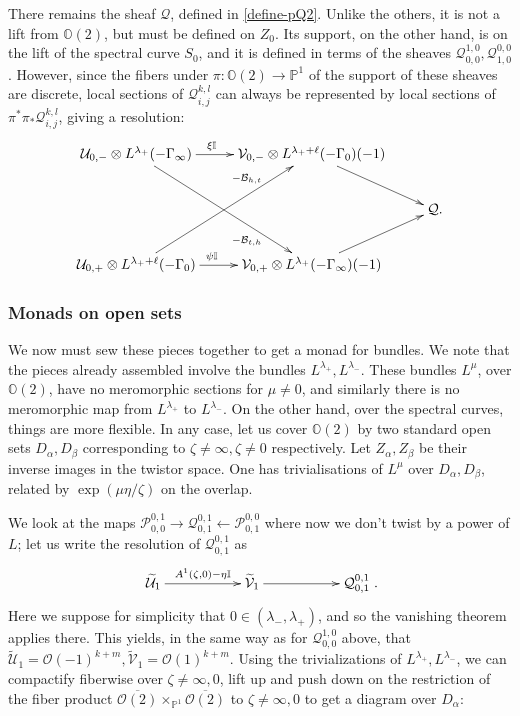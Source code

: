 \documentclass[12pt]{article}
\theoremstyle{definition}
\theoremstyle{remark}
\numberwithin{theorem}{section}
\def\bP{{\mathbb {P}}}
\def\bO{{\mathbb {O}}}
\def\bI{{\mathbb {I}}}
\def\pB{{\mathcal B}}
\def\pO{{\mathcal O}}
\def\pP{{\mathcal P}}
\def\pQ{{\mathcal Q}}
\def\pU{{\mathcal U}}
\def\pV{{\mathcal V}}
\begin{document}
There remains the sheaf $\pQ$, defined in \eqref{define-pQ2}. Unlike the others, it is not a lift from $\bO(2)$, but must be defined on $Z_0.$  Its support, on the other hand, is on the lift of the spectral curve $S_0$, and it is defined in terms of the sheaves $\pQ_{0 ,0}^{ 1,0}, \pQ^{0 ,0}_{ 1,0}$. However, since the fibers under  $\pi: \bO(2)\rightarrow \bP^1$ of the  support of these sheaves are discrete, local sections of  $\pQ_{i,j}^{ k,l}$ can always be represented by local sections of $\pi^*\pi_*\pQ_{i,j}^{ k,l}$, giving a resolution:
 \begin{equation} \label{define-pQ2-twistor}\xymatrix{  
\pU_{0,-}\otimes L^{\lambda_+ }(-\Gamma_\infty)   \ar[ddr]_(0.7){- \pB_{t,h}}\ar[r]^(0.43){\xi\bI} &  \pV_{0,-}\otimes L^{\lambda_++\ell} (-\Gamma_0 ) (-1)   \ar[dr] \\ 
 &&\pQ. \\
 \pU_{0,+}\otimes L^{\lambda_+ +\ell}( -\Gamma_0)  \ar[uur]^(0.7){ -  \pB_{h,t}}\ar[r]^(0.43){\psi\bI} &  \pV_{0,+}\otimes L^{\lambda_+ }(-\Gamma_\infty )  (-1) \ar[ru]  \\}
\end{equation}
  

 \subsubsection {Monads on open sets}
 
We now must sew these pieces together to get a monad for bundles. We note that the pieces already assembled involve the bundles $L^{\lambda_+}, L^{\lambda_-}$. These bundles $L^\mu$, over $\bO(2)$, have no meromorphic sections for $\mu\neq 0$, and similarly there is no meromorphic map from $L^{\lambda_+}$ to $L^{\lambda_-}$. On the other hand, over the spectral curves, things are more flexible. In any case, let us cover $\bO(2)$ by two standard open sets $D_\alpha, D_\beta$ corresponding to $\zeta \neq \infty, \zeta\neq 0$ respectively. Let  $Z_\alpha, Z_\beta$ be their inverse images in the twistor space. One has trivialisations of $L^\mu$ over $D_\alpha, D_\beta$, related by $\exp(\mu \eta/\zeta)$ on the overlap.

We look at the maps $ \pP_{0,0}^{0,1}\rightarrow \pQ^{0,1}_{0,1}\leftarrow \pP^{0,0}_{0,1}$ where now we don't twist by a power of $L$; let us write the resolution of  $\pQ^{0,1}_{0,1}$ as
  \begin{equation}  \xymatrix{  
       \widetilde \pU_{1}  \ar[rr]^{  A^1(\zeta,0)-\eta\bI} &&\widetilde\pV_{1}  \ar[rr]  &&\pQ_{0,1}^{0,1}}.\end{equation}
Here we suppose for simplicity that $0\in (\lambda_-,\lambda_+)$, and so the vanishing theorem applies there. This yields, in the same way as for $\pQ^{1,0}_{0,0}$ above, that  $\widetilde \pU_{1}  = \pO(-1)^{k+m}, \widetilde \pV_{1}  = \pO( 1)^{k+m}$.  
 Using the trivializations of $L^{\lambda_+}, L^{\lambda_-}$, we can compactify  fiberwise over $\zeta\neq \infty, 0$, lift up and push down on the restriction of the fiber product $\overline{\pO(2)}\times_{\bP^1} \overline{\pO(2)}$ to $\zeta\neq \infty, 0$ to get a diagram over $D_\alpha $:
         
\end{document}
